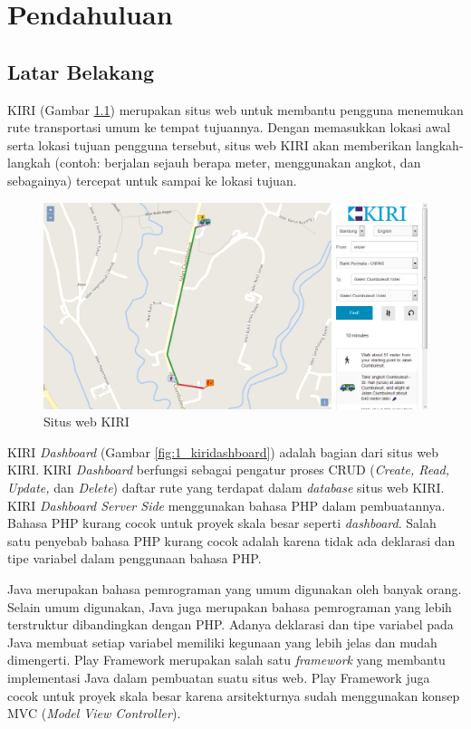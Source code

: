 \chapter{Pendahuluan}
\label{chap:pendahuluan}

\section{Latar Belakang}
\label{sec:latar_belakang}
KIRI\cite{kiritravel} (Gambar \ref{fig:1_kiritravel}) merupakan situs web untuk membantu pengguna menemukan rute transportasi umum ke tempat tujuannya. Dengan memasukkan lokasi awal serta lokasi tujuan pengguna tersebut, situs web KIRI akan memberikan langkah-langkah (contoh: berjalan sejauh berapa meter, menggunakan angkot, dan sebagainya) tercepat untuk sampai ke lokasi tujuan.

\begin{figure}[htbp]
	\centering
		\includegraphics[scale=0.35]{Gambar/1_kiritravel.png}
	\caption{Situs web KIRI\cite{kiritravel}}
	\label{fig:1_kiritravel}
\end{figure}

KIRI \textit{Dashboard}\cite{devkiritravel} (Gambar \ref{fig:1_kiridashboard}) adalah bagian dari situs web KIRI. KIRI \textit{Dashboard} berfungsi sebagai pengatur proses CRUD (\textit{Create, Read, Update,} dan \textit{Delete}) daftar rute yang terdapat dalam \textit{database} situs web KIRI. KIRI \textit{Dashboard Server Side} menggunakan bahasa PHP dalam pembuatannya\cite{kiridashboard}. Bahasa PHP kurang cocok untuk proyek skala besar seperti \textit{dashboard}. Salah satu penyebab bahasa PHP kurang cocok adalah karena tidak ada deklarasi dan tipe variabel dalam penggunaan bahasa PHP.

Java merupakan bahasa pemrograman yang umum digunakan oleh banyak orang. Selain umum digunakan, Java juga merupakan bahasa pemrograman yang lebih terstruktur dibandingkan dengan PHP. Adanya deklarasi dan tipe variabel pada Java membuat setiap variabel memiliki kegunaan yang lebih jelas dan mudah dimengerti. Play Framework merupakan salah satu \textit{framework} yang membantu implementasi Java dalam pembuatan suatu situs web. Play Framework juga cocok untuk proyek skala besar karena arsitekturnya sudah menggunakan konsep MVC (\textit{Model View Controller})\cite{playforjava}.

